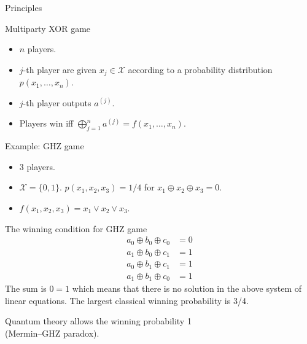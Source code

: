 \documentclass{beamer}
\newcommand\emm[1]{\textcolor{redorange}{{#1}}}
\begin{document}
\begin{frame}{Principles}
\end{frame}

\begin{frame}{Multiparty XOR game}
\begin{itemize}
\setlength{\itemsep}{2em}
\item $n$ players.
\item $j$-th player are given $x_j\in\mathcal{X}$ according to a probability distribution $p(x_1,\dotsc,x_n)$.
\item $j$-th player outputs $a^{(j)}$.
\item Players win iff $\bigoplus_{j=1}^n a^{(j)} = f(x_1,\dotsc,x_n)$.
\end{itemize}

\vspace{1em}
Example: GHZ game
\begin{itemize}
\setlength{\itemsep}{1em}
\item 3 players.
\item $\mathcal{X}=\{0,1\}$. $p(x_1,x_2,x_3) = 1/4$ for $x_1\oplus x_2\oplus x_3=0$.
\item $f(x_1,x_2,x_3) = x_1\vee x_2\vee x_3$.
\end{itemize}
\end{frame}

\begin{frame}{The winning condition for GHZ game}
\begin{align*}
a_0\oplus b_0 \oplus c_0 &= 0\\
a_1\oplus b_0 \oplus c_1 &= 1\\
a_0\oplus b_1 \oplus c_1 &= 1\\
a_1\oplus b_1 \oplus c_0 &= 1
\end{align*}
The sum is $0=1$ which means that there is no solution in the above system of linear equations.
The largest classical winning probability is 3/4.

\vspace{2em}
\centering
Quantum theory allows the winning probability \emm{1}\\
(Mermin--GHZ paradox).
\end{frame}
\end{document}
